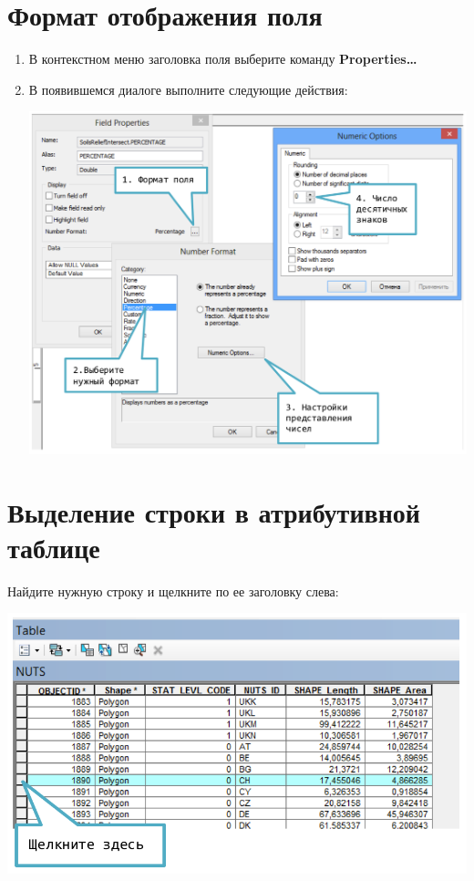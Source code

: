 \documentclass[12pt,]{book}
\begin{document}
\hypertarget{section-36}{%
\section{Формат отображения поля}\label{section-36}}

\begin{enumerate}
\def\labelenumi{\arabic{enumi}.}
\item
  В контекстном меню заголовка поля выберите команду \textbf{Properties\ldots{}}
\item
  В появившемся диалоге выполните следующие действия:

  \includegraphics{images/Appendix/image70.png}
\end{enumerate}

\hypertarget{section-37}{%
\section{Выделение строки в атрибутивной таблице}\label{section-37}}

Найдите нужную строку и щелкните по ее заголовку слева:

\includegraphics{images/Appendix/image71.png}
\end{document}
